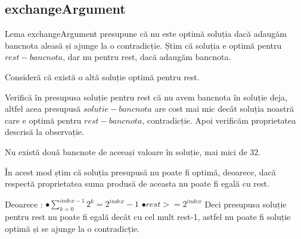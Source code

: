     \subsection{exchangeArgument}
    Lema exchangeArgument presupune că nu este optimă soluția dacă adaugăm bancnota aleasă și ajunge la o contradicție.
    Știm că soluția e optimă pentru $rest - bancnota$, dar nu pentru rest, dacă adaugăm bancnota.\par
    Consideră că există o altă soluție optimă pentru rest.\par
    Verifică în presupusa soluție pentru rest că nu avem bancnota în soluție deja, altfel acea presupusă 
    $solutie - bancnota$ are cost mai mic decât soluția noastră care e optimă pentru $rest - bancnota$, contradicție.
    Apoi verificăm proprietatea descrisă la observație.\par
    Nu există două bancnote de aceeași valoare în soluție, mai mici de 32.\par
    În acest mod știm că soluția presupusă nu poate fi optimă, deoarece, dacă respectă proprietatea
    suma produsă de aceasta nu poate fi egală cu rest. \par
    Deoarece :
    $\bullet \sum_{k=0}^{index-1} 2^{k} = 2^{index}-1 $
    $\bullet rest > = 2^{index} $
    Deci presupusa soluție pentru rest nu poate fi egală decât cu cel mult rest-1, astfel nu poate fi soluție optimă și se ajunge la o contradicție. 

